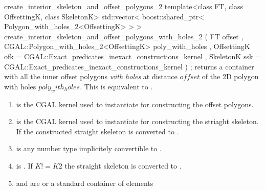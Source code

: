 \begin{ccRefFunction}{create_interior_skeleton_and_offset_polygons_2}
\ccFunction
{template<class FT, class OffsettingK, class SkeletonK>
std::vector< boost::shared_ptr< Polygon_with_holes_2<OffsettingK> > >
create_interior_skeleton_and_offset_polygons_with_holes_2 
  ( FT offset
  , CGAL::Polygon_with_holes_2<OffsettingK> poly_with_holes
  , OffsettingK ofk = CGAL::Exact_predicates_inexact_constructions_kernel
  , SkeletonK ssk   = CGAL::Exact_predicates_inexact_constructions_kernel
  ) ;
}
{returns a container with all the inner offset polygons {\em with holes} at distance $offset$ of the 2D polygon with holes $poly_with_holes$.
This is equivalent to .}

\begin{enumerate}  
   \item    {} is the CGAL kernel used to instantiate
                             for constructing 
                            the offset polygons.
   \item    {} is the CGAL kernel used to instantiate
                             for constructing 
                            the striaght skeleton.
                            If  the constructed straight skeleton
                            is converted to .
   \item    {} is any number type implicitely convertible to .
   \item    {} is . 
            If $K != K2$ the straight skeleton is converted to .
   \item    {} and  are 
            or a standard container of  elements 
\end{enumerate}

\ccSeeAlso
{}\\
 \\

\end{ccRefFunction}


